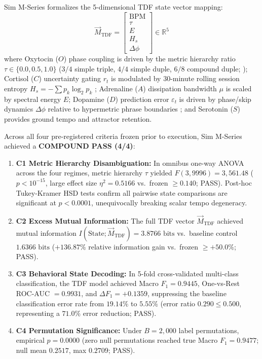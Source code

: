 \documentclass[11pt,twocolumn]{article}
\theoremstyle{plain}
\begin{document}
Sim M-Series formalizes the 5-dimensional TDF state vector mapping:
\begin{equation}
\vec{M}_{\text{TDF}} = \begin{bmatrix} \text{BPM} \\ \tau \\ E \\ H_s \\ \Delta \phi \end{bmatrix} \in \mathbb{R}^5
\end{equation}
where Oxytocin ($O$) phase coupling is driven by the metric hierarchy ratio $\tau \in \{0.0, 0.5, 1.0\}$ ($3/4$ simple triple, $4/4$ simple duple, $6/8$ compound duple; \citealp{london2012}); Cortisol ($C$) uncertainty gating $r_t$ is modulated by 30-minute rolling session entropy $H_s = -\sum p_k \log_2 p_k$ \citep{chanda2013}; Adrenaline ($A$) dissipation bandwidth $\mu$ is scaled by spectral energy $E$; Dopamine ($D$) prediction error $\varepsilon_t$ is driven by phase/skip dynamics $\Delta \phi$ relative to hypermetric phrase boundaries \citep{huron2006,salimpoor2011}; and Serotonin ($S$) provides ground tempo and attractor retention.

Across all four pre-registered criteria frozen prior to execution, Sim M-Series achieved a \textbf{COMPOUND PASS (4/4)}:
\begin{enumerate}
\item \textbf{C1 Metric Hierarchy Disambiguation:} In omnibus one-way ANOVA across the four regimes, metric hierarchy $\tau$ yielded $F(3, 9996) = 3{,}561.48$ ($p < 10^{-15}$, large effect size $\eta^2 = 0.5166$ vs.\ frozen $\ge 0.140$; PASS). Post-hoc Tukey-Kramer HSD tests confirm all pairwise state comparisons are significant at $p < 0.0001$, unequivocally breaking scalar tempo degeneracy.
\item \textbf{C2 Excess Mutual Information:} The full TDF vector $\vec{M}_{\text{TDF}}$ achieved mutual information $I(\text{State}; \vec{M}_{\text{TDF}}) = 3.8766\text{ bits}$ vs.\ baseline control $1.6366\text{ bits}$ ($+136.87\%$ relative information gain vs.\ frozen $\ge +50.0\%$; PASS).
\item \textbf{C3 Behavioral State Decoding:} In 5-fold cross-validated multi-class classification, the TDF model achieved Macro $F_1 = 0.9445$, One-vs-Rest ROC-AUC $= 0.9931$, and $\Delta F_1 = +0.1359$, suppressing the baseline classification error rate from $19.14\%$ to $5.55\%$ (error ratio $0.290 \le 0.500$, representing a $71.0\%$ error reduction; PASS).
\item \textbf{C4 Permutation Significance:} Under $B = 2{,}000$ label permutations, empirical $p = 0.0000$ (zero null permutations reached true Macro $F_1 = 0.9477$; null mean $0.2517$, max $0.2709$; PASS).
\end{enumerate}
\end{document}
